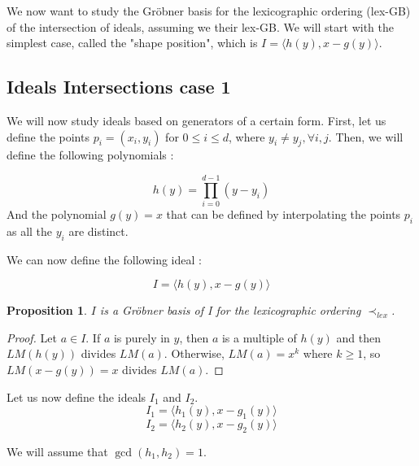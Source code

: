 \documentclass{article}
\newtheorem{proposition}{Proposition}[section]
\begin{document}
We now want to study the Gröbner basis for the lexicographic ordering (lex-GB) of the intersection of ideals, assuming we their lex-GB.
We will start with the simplest case, called the "shape position", which is $I = \langle h(y), x - g(y) \rangle$. \\

\subsection*{Ideals Intersections case 1}

We will now study ideals based on generators of a certain form. 
First, let us define the points $p_{i} = (x_{i}, y_{i})$ for $0 \leq i \leq d$, where $y_{i} \neq y_{j}, \forall i, j$. 
Then, we will define the following polynomials : 

\begin{displaymath}
    h(y) = \prod_{i=0}^{d-1} (y - y_{i}) 
\end{displaymath}
And the polynomial $g(y) = x$ that can be defined by interpolating the points $p_{i}$ as all the $y_{i}$ are distinct. 

We can now define the following ideal : 

\begin{displaymath}
    I = \langle h(y), x - g(y) \rangle
\end{displaymath}

\begin{proposition}
    $I$ is a Gröbner basis of I for the lexicographic ordering $\prec_{lex}$.  
\end{proposition}

\begin{proof}
    Let $a \in I$. If $a$ is purely in $y$, then $a$ is a multiple of $h(y)$ and then $LM(h(y))$ divides $LM(a)$. Otherwise, $LM(a) = x^{k}$ where $k \geq 1$, so $LM(x - g(y)) = x$ divides $LM(a)$.
\end{proof}

Let us now define the ideals $I_{1}$ and $I_{2}$. 
\begin{displaymath}
    I_{1} = \langle h_{1}(y), x - g_{1}(y) \rangle
\end{displaymath}
\begin{displaymath}
    I_{2} = \langle h_{2}(y), x - g_{2}(y) \rangle
\end{displaymath}

We will assume that $\gcd(h_{1}, h_{2}) = 1$.
\end{document}
